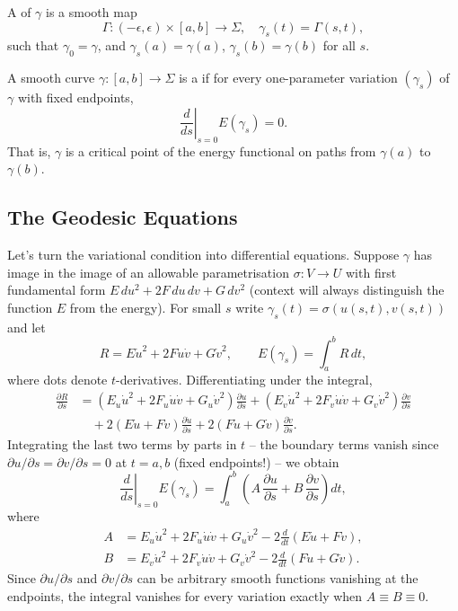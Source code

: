\documentclass[a4paper]{scrartcl}
\begin{document}
\begin{definition}[Variation]
    A  of $\gamma$ is a smooth map
    $$
    \Gamma: (-\epsilon, \epsilon) \times [a, b] \rightarrow \Sigma, \quad \gamma_s(t) = \Gamma(s, t),
    $$
    such that $\gamma_0 = \gamma$, and $\gamma_s(a) = \gamma(a)$, $\gamma_s(b) = \gamma(b)$ for all $s$.
\end{definition}

\begin{definition}[Geodesic]
    A smooth curve $\gamma: [a, b] \rightarrow \Sigma$ is a  if for every one-parameter variation $(\gamma_s)$ of $\gamma$ with fixed endpoints,
    $$
    \left.\frac{d}{ds}\right|_{s = 0} E(\gamma_s) = 0.
    $$
    That is, $\gamma$ is a critical point of the energy functional on paths from $\gamma(a)$ to $\gamma(b)$.
\end{definition}

\subsection{The Geodesic Equations}

Let's turn the variational condition into differential equations. Suppose $\gamma$ has image in the image of an allowable parametrisation $\sigma: V \rightarrow U$ with first fundamental form $E\,du^2 + 2F\,du\,dv + G\,dv^2$ (context will always distinguish the function $E$ from the energy). For small $s$ write $\gamma_s(t) = \sigma(u(s,t), v(s,t))$ and let
$$
R = E \dot u^2 + 2F \dot u \dot v + G \dot v^2, \qquad E(\gamma_s) = \int_a^b R \, dt,
$$
where dots denote $t$-derivatives. Differentiating under the integral,
\begin{align*}
    \frac{\partial R}{\partial s} &= \left(E_u \dot u^2 + 2F_u \dot u \dot v + G_u \dot v^2\right)\frac{\partial u}{\partial s} + \left(E_v \dot u^2 + 2F_v \dot u \dot v + G_v \dot v^2\right)\frac{\partial v}{\partial s} \\
    &\quad + 2\left(E \dot u + F \dot v\right) \frac{\partial \dot u}{\partial s} + 2\left(F \dot u + G \dot v\right)\frac{\partial \dot v}{\partial s}.
\end{align*}
Integrating the last two terms by parts in $t$ -- the boundary terms vanish since $\partial u/\partial s = \partial v /\partial s = 0$ at $t = a, b$ (fixed endpoints!) -- we obtain
$$
\left.\frac{d}{ds}\right|_{s=0} E(\gamma_s) = \int_a^b \left(A \, \frac{\partial u}{\partial s} + B \, \frac{\partial v}{\partial s}\right) dt,
$$
where
\begin{align*}
    A &= E_u \dot u^2 + 2 F_u \dot u \dot v + G_u \dot v^2 - 2 \frac{d}{dt}\left(E \dot u + F \dot v\right), \\
    B &= E_v \dot u^2 + 2F_v \dot u \dot v + G_v \dot v^2 - 2\frac{d}{dt}\left(F \dot u + G \dot v\right).
\end{align*}
Since $\partial u/\partial s$ and $\partial v/\partial s$ can be arbitrary smooth functions vanishing at the endpoints, the integral vanishes for every variation exactly when $A \equiv B \equiv 0$.
\end{document}
